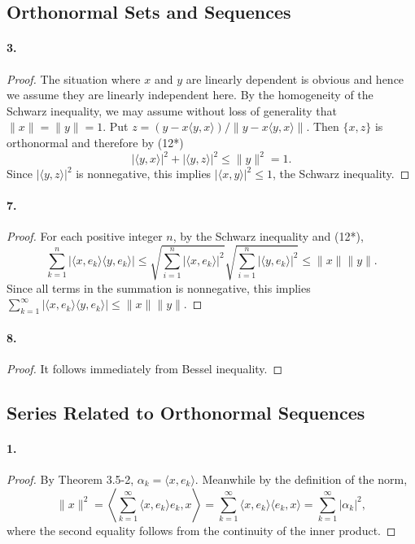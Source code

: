 \subsection{Orthonormal Sets and Sequences}
  \paragraph{3.}
  \begin{proof}
    The situation where $x$ and $y$ are linearly dependent is obvious and hence
    we assume they are linearly independent here. By the homogeneity of the
    Schwarz inequality, we may assume without loss of generality that $\|x\|=
    \|y\|=1$. Put $z=(y-x\langle y,x\rangle)/\|y-x\langle y,x\rangle\|$. Then
    $\{x,z\}$ is orthonormal and therefore by (12*)
    \[
      |\langle y,x\rangle|^2+|\langle y,z\rangle|^2 \le \|y\|^2 = 1.
    \]
    Since $|\langle y,z\rangle|^2$ is nonnegative, this implies $|\langle x,y
    \rangle|^2\le 1$, the Schwarz inequality.
  \end{proof}
  
  \paragraph{7.}
  \begin{proof}
    For each positive integer $n$, by the Schwarz inequality and (12*),
    \[
      \sum_{k=1}^n|\langle x,e_k\rangle\langle y,e_k\rangle|\le
      \sqrt{\sum_{i=1}^n|\langle x,e_k\rangle|^2}
      \sqrt{\sum_{i=1}^n|\langle y,e_k\rangle|^2} \le
      \|x\|\|y\|.
    \]
    Since all terms in the summation is nonnegative, this implies $\sum_{k=1}
    ^\infty|\langle x,e_k\rangle\langle y,e_k\rangle|\le\|x\|\|y\|$.
  \end{proof}
  
  \paragraph{8.}
  \begin{proof}
    It follows immediately from Bessel inequality.
  \end{proof}

\subsection{Series Related to Orthonormal Sequences}
  \paragraph{1.}
  \begin{proof}
    By Theorem 3.5-2, $\alpha_k=\langle x,e_k\rangle$. Meanwhile by the 
    definition of the norm,
    \[
      \|x\|^2 = 
      \left\langle \sum_{k=1}^\infty\langle x,e_k\rangle e_k, x\right\rangle =
      \sum_{k=1}^\infty \langle x,e_k\rangle\langle e_k, x\rangle =
      \sum_{k=1}^\infty|\alpha_k|^2,
    \]
    where the second equality follows from the continuity of the inner product.
  \end{proof}
  

